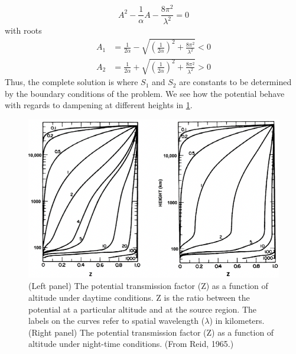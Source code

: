 \begin{equation*}
    A^2-\frac{1}{\alpha}A-\frac{8\pi^2}{\lambda^2}=0
\end{equation*}
with roots
\begin{align*}
    A_1&=\frac{1}{2\alpha}-\sqrt{{\left(\frac{1}{2\alpha}\right)}^2+\frac{8\pi^2}{\lambda^2}}<0\\
    A_2&=\frac{1}{2\alpha}+\sqrt{{\left(\frac{1}{2\alpha}\right)}^2+\frac{8\pi^2}{\lambda^2}}>0
\end{align*}
Thus, the complete solution is
where \(S_1\) and \(S_2\) are constants to be determined by the boundary conditions of the problem. We see how the potential behave with regards to dampening at different heights in \cref{fig:L14_electric_potential}.
\begin{figure}[t]
    \centering
    \includegraphics[width=.8\linewidth]{bilder/L14_electric_potential.png}
    \caption{(Left panel) The potential transmission factor (Z) as a function of altitude under daytime conditions. Z is the ratio between the potential at a particular altitude and at the source region. The labels on the curves refer to spatial wavelength (\(\lambda \)) in kilometers. (Right panel) The potential transmission factor (Z) as a function of altitude under night-time conditions. (From Reid, 1965.)}\label{fig:L14_electric_potential}
\end{figure}